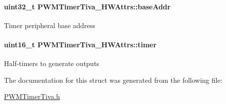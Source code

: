 \paragraph[{base\+Addr}]{\setlength{\rightskip}{0pt plus 5cm}uint32\+\_\+t P\+W\+M\+Timer\+Tiva\+\_\+\+H\+W\+Attrs\+::base\+Addr}\label{struct_p_w_m_timer_tiva___h_w_attrs_a1514de8d9b83a66fbed22b8427d20655}
Timer peripheral base address 
\paragraph[{timer}]{\setlength{\rightskip}{0pt plus 5cm}uint16\+\_\+t P\+W\+M\+Timer\+Tiva\+\_\+\+H\+W\+Attrs\+::timer}\label{struct_p_w_m_timer_tiva___h_w_attrs_aa14d05c47183c46a7314da656125bbc9}
Half-\/timers to generate outputs 

The documentation for this struct was generated from the following file\+:\begin{DoxyCompactItemize}
\item 
\hyperlink{_p_w_m_timer_tiva_8h}{P\+W\+M\+Timer\+Tiva.\+h}\end{DoxyCompactItemize}
